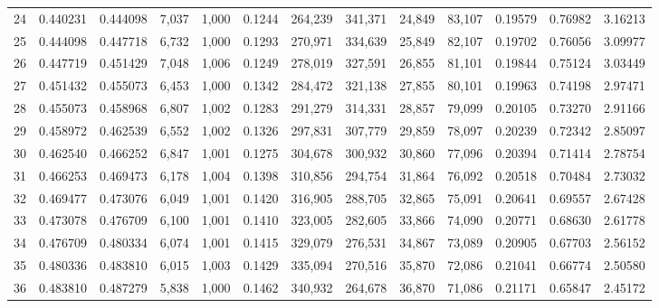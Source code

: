 \begin{tabular}{rrrrrrrrrrrrr}
24  &  0.440231 &  0.444098 &   7,037 &  1,000 &                                     0.1244 &  264,239 &  341,371 &   24,849 &   83,107 &  0.19579 &  0.76982 &  3.16213 \\
25  &  0.444098 &  0.447718 &   6,732 &  1,000 &                                     0.1293 &  270,971 &  334,639 &   25,849 &   82,107 &  0.19702 &  0.76056 &  3.09977 \\
26  &  0.447719 &  0.451429 &   7,048 &  1,006 &                                     0.1249 &  278,019 &  327,591 &   26,855 &   81,101 &  0.19844 &  0.75124 &  3.03449 \\
27  &  0.451432 &  0.455073 &   6,453 &  1,000 &                                     0.1342 &  284,472 &  321,138 &   27,855 &   80,101 &  0.19963 &  0.74198 &  2.97471 \\
28  &  0.455073 &  0.458968 &   6,807 &  1,002 &                                     0.1283 &  291,279 &  314,331 &   28,857 &   79,099 &  0.20105 &  0.73270 &  2.91166 \\
29  &  0.458972 &  0.462539 &   6,552 &  1,002 &                                     0.1326 &  297,831 &  307,779 &   29,859 &   78,097 &  0.20239 &  0.72342 &  2.85097 \\
30  &  0.462540 &  0.466252 &   6,847 &  1,001 &                                     0.1275 &  304,678 &  300,932 &   30,860 &   77,096 &  0.20394 &  0.71414 &  2.78754 \\
31  &  0.466253 &  0.469473 &   6,178 &  1,004 &                                     0.1398 &  310,856 &  294,754 &   31,864 &   76,092 &  0.20518 &  0.70484 &  2.73032 \\
32  &  0.469477 &  0.473076 &   6,049 &  1,001 &                                     0.1420 &  316,905 &  288,705 &   32,865 &   75,091 &  0.20641 &  0.69557 &  2.67428 \\
33  &  0.473078 &  0.476709 &   6,100 &  1,001 &                                     0.1410 &  323,005 &  282,605 &   33,866 &   74,090 &  0.20771 &  0.68630 &  2.61778 \\
34  &  0.476709 &  0.480334 &   6,074 &  1,001 &                                     0.1415 &  329,079 &  276,531 &   34,867 &   73,089 &  0.20905 &  0.67703 &  2.56152 \\
35  &  0.480336 &  0.483810 &   6,015 &  1,003 &                                     0.1429 &  335,094 &  270,516 &   35,870 &   72,086 &  0.21041 &  0.66774 &  2.50580 \\
36  &  0.483810 &  0.487279 &   5,838 &  1,000 &                                     0.1462 &  340,932 &  264,678 &   36,870 &   71,086 &  0.21171 &  0.65847 &  2.45172 \\

\end{tabular}
